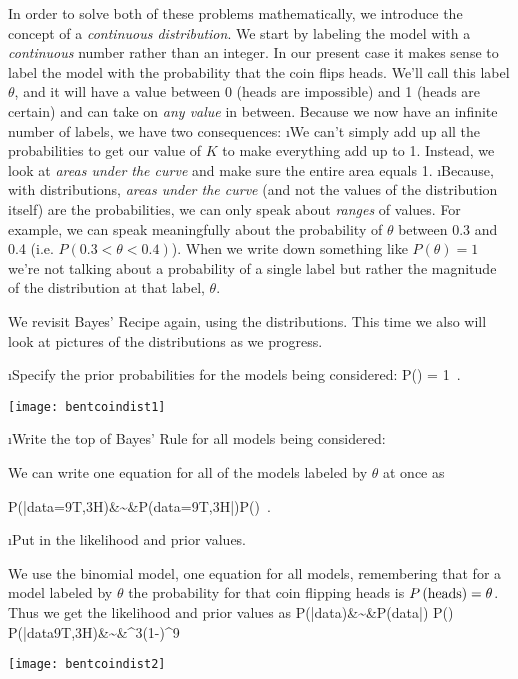 In order to solve both of these problems mathematically, we introduce the concept of a {\em continuous distribution}.  We start by labeling the model with a {\em continuous} number rather than an integer.  In our present case it makes sense to label the model with the probability that the coin flips heads.  We'll call this label $\theta$, and it will have a value between 0 (heads are impossible) and 1 (heads are certain) and can take on {\em any value} in between.  Because we now have an infinite number of labels, we have two consequences:
\be
\i We can't simply add up all the probabilities to get our value of $K$ to make everything add up to 1.  Instead, we look at {\em areas under the curve} and make sure the entire area equals 1.
\i Because, with distributions, \emph{areas under the curve} (and not the values of the distribution itself) are the probabilities, we can only speak about {\em ranges} of values.  For example, we can speak meaningfully about the probability of $\theta$ between 0.3 and 0.4 (i.e. $P(0.3<\theta<0.4)$).  When we write down something like $P(\theta)=1$ we're not talking about a probability of a single label but rather the magnitude of the distribution at that label, $\theta$.
\ee

We revisit Bayes' Recipe again, using the distributions.  This time we also will look at pictures of the distributions as we progress.

\be
\i Specify the prior probabilities for the models being considered:
\beqn
P(\theta) = 1 \,.
\eeqn
\begin{marginfigure}
\texttt{[image: bentcoindist1]}
\end{marginfigure}

\i Write the top of Bayes' Rule for all models being considered:

We can write one equation for all of the models labeled by $\theta$ at once as

\beqn
P(\theta|{\rm data}=9T,3H)&\sim&P({\rm data}=9T,3H|\theta)P(\theta) \,.
\eeqn

\i Put in the likelihood and prior values.

We use the binomial model, one equation for all models, remembering that for a model labeled by $\theta$ the probability for that coin flipping heads is $\P{heads}=\theta$.  Thus we get the likelihood and prior values as
\beqn
P(\theta|{\rm data})&\sim&P({\rm data}|\theta) \cdot P(\theta)\\
P(\theta|{\rm data}9T,3H)&\sim&\theta^{3}\times (1-\theta)^{9} 
\eeqn
\begin{marginfigure}
\texttt{[image: bentcoindist2]}
\end{marginfigure}

